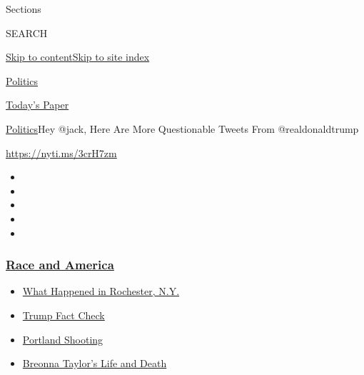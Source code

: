 Sections

SEARCH

\protect\hyperlink{site-content}{Skip to
content}\protect\hyperlink{site-index}{Skip to site index}

\href{https://www.nytimes3xbfgragh.onion/section/politics}{Politics}

\href{https://myaccount.nytimes3xbfgragh.onion/auth/login?response_type=cookie\&client_id=vi}{}

\href{https://www.nytimes3xbfgragh.onion/section/todayspaper}{Today's
Paper}

\href{/section/politics}{Politics}\textbar{}Hey @jack, Here Are More
Questionable Tweets From @realdonaldtrump

\url{https://nyti.ms/3crH7zm}

\begin{itemize}
\item
\item
\item
\item
\item
\end{itemize}

\hypertarget{race-and-america}{%
\subsubsection{\texorpdfstring{\href{https://www.nytimes3xbfgragh.onion/news-event/george-floyd-protests-minneapolis-new-york-los-angeles?name=styln-george-floyd\&region=TOP_BANNER\&block=storyline_menu_recirc\&action=click\&pgtype=Article\&impression_id=6f933830-f2ab-11ea-b152-11fbf9e92c26\&variant=undefined}{Race
and America}}{Race and America}}\label{race-and-america}}

\begin{itemize}
\tightlist
\item
  \href{https://www.nytimes3xbfgragh.onion/2020/09/04/nyregion/rochester-police-daniel-prude.html?name=styln-george-floyd\&region=TOP_BANNER\&block=storyline_menu_recirc\&action=click\&pgtype=Article\&impression_id=6f935f40-f2ab-11ea-b152-11fbf9e92c26\&variant=undefined}{What
  Happened in Rochester, N.Y.}
\item
  \href{https://www.nytimes3xbfgragh.onion/2020/09/01/us/politics/trump-fact-check-protests.html?name=styln-george-floyd\&region=TOP_BANNER\&block=storyline_menu_recirc\&action=click\&pgtype=Article\&impression_id=6f935f41-f2ab-11ea-b152-11fbf9e92c26\&variant=undefined}{Trump
  Fact Check}
\item
  \href{https://www.nytimes3xbfgragh.onion/2020/08/30/us/portland-shooting-explained.html?name=styln-george-floyd\&region=TOP_BANNER\&block=storyline_menu_recirc\&action=click\&pgtype=Article\&impression_id=6f935f42-f2ab-11ea-b152-11fbf9e92c26\&variant=undefined}{Portland
  Shooting}
\item
  \href{https://www.nytimes3xbfgragh.onion/2020/08/30/us/breonna-taylor-police-killing.html?name=styln-george-floyd\&region=TOP_BANNER\&block=storyline_menu_recirc\&action=click\&pgtype=Article\&impression_id=6f935f43-f2ab-11ea-b152-11fbf9e92c26\&variant=undefined}{Breonna
  Taylor's Life and Death}
\end{itemize}

